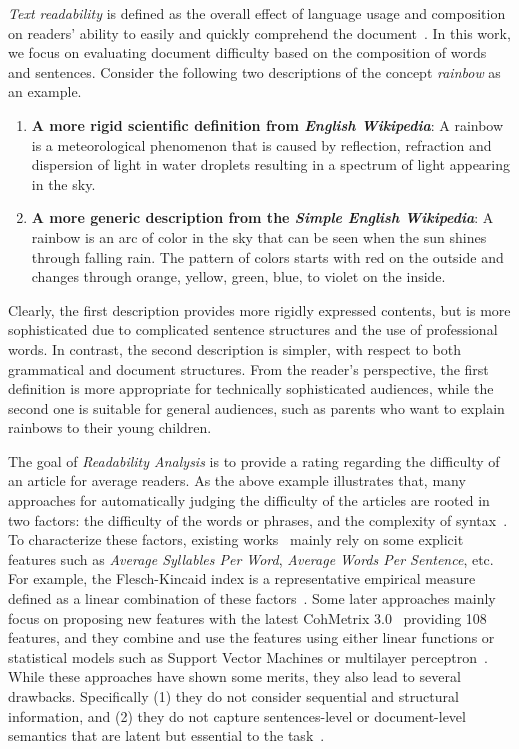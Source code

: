 \documentclass[runningheads]{llncs}
\begin{document}
{\em Text readability} is defined as the overall effect of language usage and composition on readers' ability to easily and quickly comprehend the document~\cite{readability}.
In this work, we focus on evaluating document difficulty based on the composition of words and sentences.
Consider the following two descriptions of the concept \emph{rainbow} as an example.



\begin{enumerate}
\item \textbf{A more rigid scientific definition from \emph{English Wikipedia}}: A rainbow is a meteorological phenomenon that is caused by reflection, refraction and dispersion of light in water droplets resulting in a spectrum of light appearing in the sky. 
\item \textbf{A more generic description from the \emph{Simple English Wikipedia}}: A rainbow is an arc of color in the sky that can be seen when the sun shines through falling rain. The pattern of colors starts with red on the outside and changes through orange, yellow, green, blue, to violet on the inside.
\end{enumerate}
Clearly, the first description provides more rigidly expressed contents, but is more sophisticated due to complicated sentence structures and the use of professional words. In contrast, the second description is simpler, with respect to both grammatical and document structures.  From the reader's perspective, the first definition is more appropriate for technically sophisticated audiences, while the second one is suitable for general audiences, such as parents who want to explain rainbows to their young children.

The goal of \emph{Readability Analysis} is to provide a rating regarding the difficulty of an article for average readers.
As the above example illustrates that, many approaches for automatically judging the difficulty of the articles are rooted in two factors: the difficulty of the words or phrases, and the complexity of syntax~\cite{CollinsSurvey}. 
To characterize these factors, existing works~\cite{readability2,readability3} mainly rely on some explicit features such as \emph{Average Syllables Per Word}, \emph{Average Words Per Sentence}, etc. For example, the Flesch-Kincaid index is a representative empirical measure defined as a linear combination of these factors~\cite{chall1995readability}. Some later approaches mainly focus on proposing new features with the latest Coh\-Metrix 3.0~\cite{mcnamara2014automated} providing 108 features, and they combine and use the features using either linear functions or statistical models such as Support Vector Machines or multilayer perceptron~\cite{SVM,collins2005predicting,pitler2008revisiting,pilan2016predicting,CambridgeData}. While these approaches have shown some merits, they also lead to several drawbacks. Specifically (1) they do not consider sequential and structural information, and  (2) they do not capture sentences-level or document-level semantics that are latent but essential to the task~\cite{CollinsSurvey}.
\end{document}
